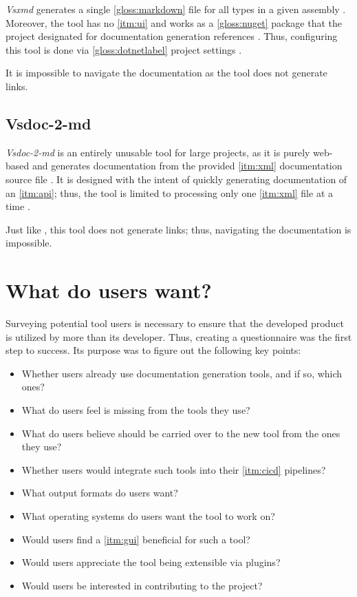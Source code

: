 \textit{Vsxmd} generates a single \ref{gloss:markdown} file for all types in a given assembly \cite{petrakis_vsxmdreadmemd_2022}. Moreover, the tool has no \ref{itm:ui} and works as a \ref{gloss:nuget} package that the project designated for documentation generation references \cite{petrakis_vsxmdreadmemd_2022}. Thus, configuring this tool is done via \ref{gloss:dotnetlabel} project settings \cite{petrakis_vsxmdreadmemd_2022}.

It is impossible to navigate the documentation as the tool does not generate links.

\subsection{Vsdoc-2-md}

\textit{Vsdoc-2-md} is an entirely unusable tool for large projects, as it is purely web-based and generates documentation from the provided \ref{itm:xml} documentation source file \cite{varus_discosultanvsdoc-2-md_2022}. It is designed with the intent of quickly generating documentation of an \ref{itm:api}; thus, the tool is limited to processing only one \ref{itm:xml} file at a time \cite{varus_discosultanvsdoc-2-md_2022}.

Just like \textit{}, this tool does not generate links; thus, navigating the documentation is impossible.

\newpage

\section{What do users want?} \label{sec:whatdouserswant}
Surveying potential tool users is necessary to ensure that the developed product is utilized by more than its developer.
Thus, creating a questionnaire was the first step to success. Its purpose was to figure out the following key points:
\begin{itemize}
    \item Whether users already use documentation generation tools, and if so, which ones?
    \item What do users feel is missing from the tools they use?
    \item What do users believe should be carried over to the new tool from the ones they use?
    \item Whether users would integrate such tools into their \ref{itm:cicd} pipelines?
    \item What output formats do users want?
    \item What operating systems do users want the tool to work on?
    \item Would users find a \ref{itm:gui} beneficial for such a tool?
    \item Would users appreciate the tool being extensible via plugins?
    \item Would users be interested in contributing to the project?
\end{itemize}


